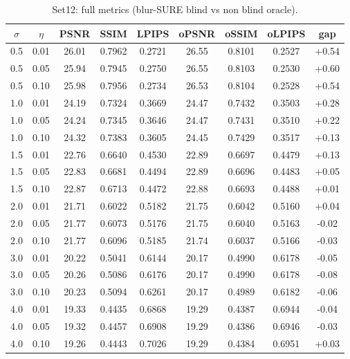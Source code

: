 \begin{table}[h]
\centering
\small
\begin{tabular}{ccccccccc}
\toprule
$\sigma$ & $\eta$ & PSNR & SSIM & LPIPS & oPSNR & oSSIM & oLPIPS & gap \\
\midrule
0.5 & 0.01 & 26.01 & 0.7962 & 0.2721 & 26.55 & 0.8101 & 0.2527 & +0.54 \\
0.5 & 0.05 & 25.94 & 0.7945 & 0.2750 & 26.55 & 0.8103 & 0.2530 & +0.60 \\
0.5 & 0.10 & 25.98 & 0.7956 & 0.2734 & 26.53 & 0.8104 & 0.2528 & +0.54 \\
1.0 & 0.01 & 24.19 & 0.7324 & 0.3669 & 24.47 & 0.7432 & 0.3503 & +0.28 \\
1.0 & 0.05 & 24.24 & 0.7345 & 0.3646 & 24.47 & 0.7431 & 0.3510 & +0.22 \\
1.0 & 0.10 & 24.32 & 0.7383 & 0.3605 & 24.45 & 0.7429 & 0.3517 & +0.13 \\
1.5 & 0.01 & 22.76 & 0.6640 & 0.4530 & 22.89 & 0.6697 & 0.4479 & +0.13 \\
1.5 & 0.05 & 22.83 & 0.6681 & 0.4494 & 22.89 & 0.6696 & 0.4483 & +0.05 \\
1.5 & 0.10 & 22.87 & 0.6713 & 0.4472 & 22.88 & 0.6693 & 0.4488 & +0.01 \\
2.0 & 0.01 & 21.71 & 0.6022 & 0.5182 & 21.75 & 0.6042 & 0.5160 & +0.04 \\
2.0 & 0.05 & 21.77 & 0.6073 & 0.5176 & 21.75 & 0.6040 & 0.5163 & -0.02 \\
2.0 & 0.10 & 21.77 & 0.6096 & 0.5185 & 21.74 & 0.6037 & 0.5166 & -0.03 \\
3.0 & 0.01 & 20.22 & 0.5041 & 0.6144 & 20.17 & 0.4990 & 0.6178 & -0.05 \\
3.0 & 0.05 & 20.26 & 0.5086 & 0.6176 & 20.17 & 0.4990 & 0.6178 & -0.08 \\
3.0 & 0.10 & 20.23 & 0.5094 & 0.6261 & 20.17 & 0.4989 & 0.6182 & -0.06 \\
4.0 & 0.01 & 19.33 & 0.4435 & 0.6868 & 19.29 & 0.4387 & 0.6944 & -0.04 \\
4.0 & 0.05 & 19.32 & 0.4457 & 0.6908 & 19.29 & 0.4386 & 0.6946 & -0.03 \\
4.0 & 0.10 & 19.26 & 0.4443 & 0.7026 & 19.29 & 0.4384 & 0.6951 & +0.03 \\
\bottomrule
\end{tabular}
\caption{Set12: full metrics (blur-SURE blind vs non blind oracle).}
\label{tab:full_metrics_set12}
\end{table}
